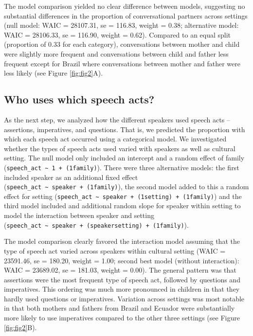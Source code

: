 \documentclass[
  man,floatsintext]{apa6}
\begin{document}
The model comparison yielded no clear difference between models, suggesting no substantial differences in the proportion of conversational partners across settings (null model: WAIC = 28107.31, se = 116.83, weight = 0.38; alternative model: WAIC = 28106.33, se = 116.90, weight = 0.62). Compared to an equal split (proportion of 0.33 for each category), conversations between mother and child were slightly more frequent and conversations between child and father less frequent except for Brazil where conversations between mother and father were less likely (see Figure \ref{fig:fig2}A).

\hypertarget{who-uses-which-speech-acts}{%
\subsection{Who uses which speech acts?}\label{who-uses-which-speech-acts}}

As the next step, we analyzed how the different speakers used speech acts -- assertions, imperatives, and questions. That is, we predicted the proportion with which each speech act occurred using a categorical model. We investigated whether the types of speech acts used varied with speakers as well as cultural setting. The null model only included an intercept and a random effect of family (\texttt{speech\_act\ \textasciitilde{}\ 1\ +\ (1\textbar{}family)}). There were three alternative models: the first included speaker as an additional fixed effect (\texttt{speech\_act\ \textasciitilde{}\ speaker\ +\ (1\textbar{}family)}), the second model added to this a random effect for setting (\texttt{speech\_act\ \textasciitilde{}\ speaker\ +\ (1\textbar{}setting)\ +\ (1\textbar{}family)}) and the third model included and additional random slope for speaker within setting to model the interaction between speaker and setting (\texttt{speech\_act\ \textasciitilde{}\ speaker\ +\ (speaker\textbar{}setting)\ +\ (1\textbar{}family)}).

The model comparison clearly favored the interaction model assuming that the type of speech act varied across speakers within cultural setting (WAIC = 23591.46, se = 180.20, weight = 1.00; second best model (without interaction): WAIC = 23689.02, se = 181.03, weight = 0.00). The general pattern was that assertions were the most frequent type of speech act, followed by questions and imperatives. This ordering was much more pronounced in children in that they hardly used questions or imperatives. Variation across settings was most notable in that both mothers and fathers from Brazil and Ecuador were substantially more likely to use imperatives compared to the other three settings (see Figure \ref{fig:fig2}B).
\end{document}
